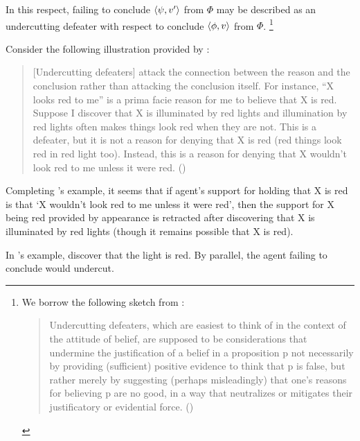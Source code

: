 \begin{note}
  In this respect, failing to conclude \(\langle \psi, v' \rangle\) from \(\Phi\) may be described as an undercutting defeater with respect to conclude \(\langle \phi, v \rangle\) from \(\Phi\).%
  \footnote{
    We borrow the following sketch from \textcite{Worsnip:2018aa}:
  \begin{quote}
    Undercutting defeaters, which are easiest to think of in the context of the attitude of belief, are supposed to be considerations that undermine the justification of a belief in a proposition p not necessarily by providing (sufficient) positive evidence to think that p is false, but rather merely by suggesting (perhaps misleadingly) that one’s reasons for believing p are no good, in a way that neutralizes or mitigates their justificatory or evidential force.%
    \mbox{}\hfill\mbox{(\citeyear[29]{Worsnip:2018aa})}
  \end{quote}
  }

  Consider the following illustration provided by \citeauthor{Pollock:1987un}:
  \begin{quote}
    [Undercutting defeaters] attack the connection between the reason and the conclusion rather than attacking the conclusion itself.
    For instance, ``X looks red to me'' is a prima facie reason for me to believe that X is red.
    Suppose I discover that X is illuminated by red lights and illumination by red lights often makes things look red when they are not.
    This is a defeater, but it is not a reason for denying that X is red (red things look red in red light too).
    Instead, this is a reason for denying that X wouldn't look red to me unless it were red.%
    \mbox{}\hfill\mbox{(\citeyear[485]{Pollock:1987un})}
  \end{quote}
  Completing \citeauthor{Pollock:1987un}'s example, it seems that if agent's support for holding that X is red is that `X wouldn't look red to me unless it were red', then the support for X being red provided by appearance is retracted after discovering that X is illuminated by red lights (though it remains possible that X is red).
\end{note}

\begin{note}
  In \citeauthor{Pollock:1987un}'s example, discover that the light is red.
  By parallel, the agent failing to conclude would undercut.
\end{note}

